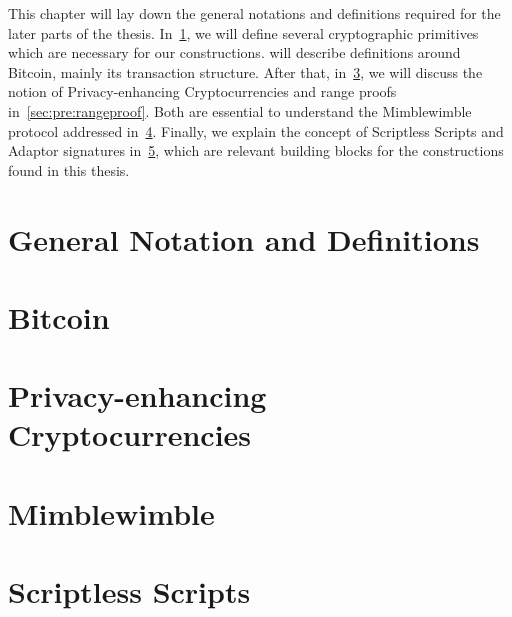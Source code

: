 This chapter will lay down the general notations and definitions required for the later parts of the thesis.
In~\cref{sec:pre:general}, we will define several cryptographic primitives which are necessary for our constructions.
 will describe definitions around Bitcoin, mainly its transaction structure.
After that, in~\cref{sec:pre:privacy}, we will discuss the notion of Privacy-enhancing Cryptocurrencies and range proofs in~\cref{sec:pre:rangeproof}.
Both are essential to understand the Mimblewimble protocol addressed in~\cref{sec:pre:mimblewimble}.
Finally, we explain the concept of Scriptless Scripts and Adaptor signatures in~\cref{sec:pre:scriptless-scripts}, which are relevant building blocks for the constructions found in this thesis.

\section{General Notation and Definitions}\label{sec:pre:general}


\section{Bitcoin} \label{sec:pre:bitcoin}


\section{Privacy-enhancing Cryptocurrencies} \label{sec:pre:privacy}


\section{Mimblewimble} \label{sec:pre:mimblewimble}


\section{Scriptless Scripts} \label{sec:pre:scriptless-scripts}


